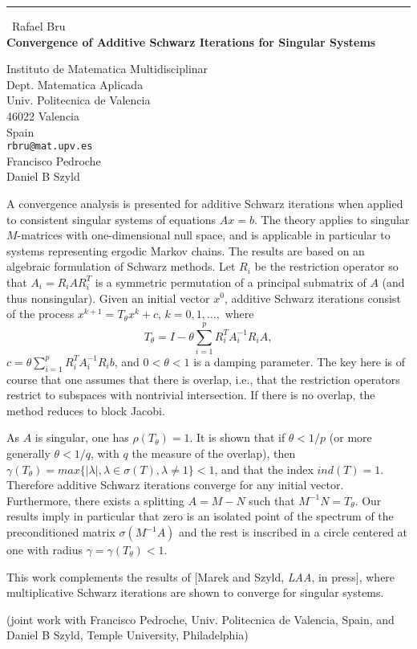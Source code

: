 \documentclass{report}
\begin{document}
\begin{center}
\rule{6in}{1pt} \
{\large Rafael Bru \\
{\bf Convergence of Additive Schwarz Iterations for Singular Systems}}

Instituto de Matematica Multidisciplinar \\ Dept. Matematica Aplicada \\ Univ. Politecnica de Valencia \\ 46022 Valencia \\ Spain
\\
{\tt rbru@mat.upv.es}\\
Francisco Pedroche\\
Daniel B Szyld\end{center}

A convergence analysis is presented for additive Schwarz iterations
when applied to consistent singular systems of equations $Ax=b$.
The theory applies to singular $M$-matrices with one-dimensional
null space, and is applicable in particular to systems representing
ergodic Markov chains.
The results are based on an algebraic formulation of Schwarz methods.
Let $R_i$ be the restriction operator so that $A_i = R_i A R_i^T$
is a symmetric permutation of a principal submatrix of $A$
(and thus nonsingular).
Given an initial vector $x^0$,
additive Schwarz iterations consist of the process
$x^{k+1}=T_{\theta}x^k+c$, $ k=0,1,\ldots ,$
where
$$%
T_{\theta} = I - \theta \sum_{i=1}^{p} R_i^{T} A_i^{-1} R_i A,
$$%
$c = \theta \sum_{i=1}^{p} R_i^{T} A_i^{-1} R_i b$,
and $ 0 < \theta < 1$ is a damping parameter.
The key here is of course that one assumes that there is
overlap, i.e., that the restriction operators restrict to
subspaces with nontrivial intersection.
If there is no overlap, the method reduces to block Jacobi.

As $A$ is singular, one has $\rho(T_\theta)=1$.
It is shown that if $\theta < 1/p$ (or more generally
$\theta < 1/q$, with $q$ the measure of the overlap), then
$\gamma(T_\theta) =
max\{ | \lambda |, \lambda \in \sigma(T), \lambda \neq 1 \} < 1 $,
and that the index $ind(T)=1$.
Therefore
additive Schwarz iterations converge for any initial vector.
Furthermore, there exists a splitting $A=M-N$ such that
$M^{-1}N = T_\theta$.
Our results imply in particular that
zero is an isolated point of
the spectrum of the
preconditioned matrix $\sigma(M^{-1}A)$
and
the rest is inscribed in a circle
centered at one with radius $\gamma = \gamma(T_\theta) <1$.

This work complements the results of [Marek and Szyld,
{\em LAA}, in press], where multiplicative Schwarz iterations
are shown to converge for singular systems.

(joint work with Francisco Pedroche, Univ. Politecnica de Valencia,
Spain, and Daniel B Szyld, Temple University, Philadelphia)
\end{document}
